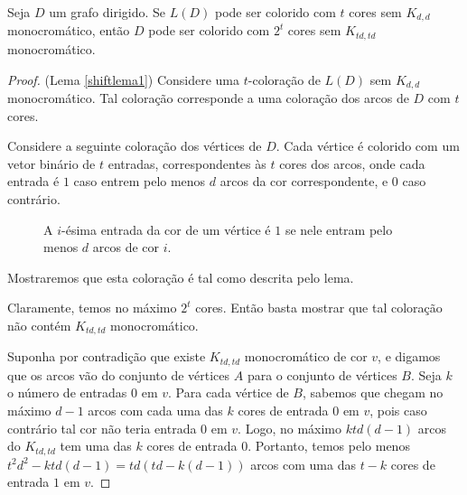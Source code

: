 \begin{lema}\label{shiftlema1}
Seja $D$ um grafo dirigido. Se $L(D)$ pode ser colorido com $t$ cores sem $K_{d,d}$ monocromático, então $D$ pode ser colorido com $2^t$ cores sem $K_{td,td}$ monocromático.
\end{lema}

\begin{proof}{(Lema \ref{shiftlema1})}
Considere uma $t$-coloração de $L(D)$ sem $K_{d,d}$ monocromático. Tal coloração corresponde a uma coloração dos arcos de $D$ com $t$ cores.

Considere a seguinte coloração dos vértices de $D$. Cada vértice é colorido com um vetor binário de $t$ entradas, correspondentes às $t$ cores dos arcos, onde cada entrada é $1$ caso entrem pelo menos $d$ arcos da cor correspondente, e $0$ caso contrário.

\begin{figure}[H]
\centering
{}
\caption{A $i$-ésima entrada da cor de um vértice é $1$ se nele entram pelo menos $d$ arcos de cor $i$.}
\label{fig:shiftarccoloringtovertex}
\end{figure}

Mostraremos que esta coloração é tal como descrita pelo lema. 

Claramente, temos no máximo $2^t$ cores. Então basta mostrar que tal coloração não contém $K_{td,td}$ monocromático.

Suponha por contradição que existe $K_{td,td}$ monocromático de cor $v$, e digamos que os arcos vão do conjunto de vértices $A$ para o conjunto de vértices $B$. Seja $k$ o número de entradas $0$ em $v$. Para cada vértice de $B$, sabemos que chegam no máximo $d-1$ arcos com cada uma das $k$ cores de entrada $0$ em $v$, pois caso contrário tal cor não teria entrada $0$ em $v$. Logo, no máximo $ktd(d-1)$ arcos do $K_{td,td}$ tem uma das $k$ cores de entrada $0$. Portanto, temos pelo menos $t^2d^2 - ktd(d-1) = td(td - k(d-1))$ arcos com uma das $t-k$ cores de entrada $1$ em $v$.


\end{proof}
